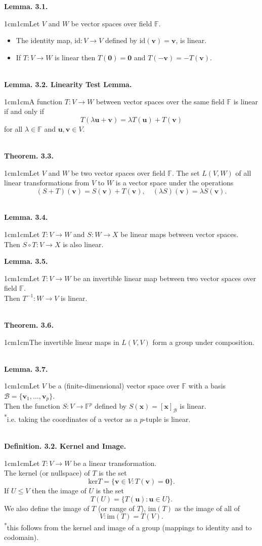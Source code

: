 \documentclass{article}
\newcommand{\vect}[1]{\mathbf{#1}}
\newcommand{\definition}[2]{\textbf{Definition. #1.}\begin{adjustwidth}{1cm}{1cm}#2\end{adjustwidth}}
\newcommand{\theorem}[2]{\textbf{Theorem. #1.}\begin{adjustwidth}{1cm}{1cm}#2\end{adjustwidth}}
\newcommand{\lemma}[2]{\textbf{Lemma. #1.}\begin{adjustwidth}{1cm}{1cm}#2\end{adjustwidth}}
\begin{document}
\lemma{3.1}{Let $V$ and $W$ be vector spaces over field $\mathbb{F}$.\begin{itemize}\item The identity map, $\text{id} : V \rightarrow V$ defined by $\text{id}(\vect{v}) = \vect{v}$, is linear. \item If $T:V \rightarrow W$ is linear then $T(\vect{0}) = \vect{0}$ and $T(-\vect{v}) = -T(\vect{v})$.\end{itemize}}~\\
\lemma{3.2. Linearity Test Lemma}{A function $T: V \rightarrow W$ between vector spaces over the same field $\mathbb{F}$ is linear if and only if \[T(\lambda \vect{u} + \vect{v}) = \lambda T(\vect{u}) + T (\vect{v})\] for all $\lambda \in \mathbb{F}$ and $\vect{u}, \vect{v} \in V$.}~\\
\theorem{3.3}{Let $V$ and $W$ be two vector spaces over field $\mathbb{F}$. The set $L(V,W)$ of all linear transformations from $V$ to $W$ is a vector space under the operations \[(S+T)(\vect{v}) = S(\vect{v}) + T(\vect{v}), \quad (\lambda S)(\vect{v}) = \lambda S(\vect{v}).\]}~\\
\lemma{3.4}{Let $T : V \rightarrow W$ and $S : W \rightarrow X$ be linear maps between vector spaces.\\Then $S \circ T: V \rightarrow X$ is also linear.}\newpage
\lemma{3.5}{Let $T : V \rightarrow W$ be an invertible linear map between two vector spaces over field $\mathbb{F}$.\\Then $T^{-1} : W \rightarrow V$ is linear.}~\\
\theorem{3.6}{The invertible linear maps in $L(V,V)$ form a group under composition.}~\\
\lemma{3.7}{Let $V$ be a (finite-dimensional) vector space over $\mathbb{F}$ with a basis $\mathcal{B} = \{ \vect{v}_1 , \ldots , \vect{v}_p \}$.\\Then the function $S : V \rightarrow \mathbb{F}^p$ defined by $S(\vect{x}) = [\vect{x}]_\mathcal{B}$ is linear.\\[1\baselineskip]\textsuperscript{*}i.e. taking the coordinates of a vector as a $p$-tuple is linear.}~\\
\definition{3.2. Kernel and Image}{Let $T : V \rightarrow W$ be a linear transformation.\\The kernel (or nullspace) of $T$ is the set \[\text{ker}T = \{ \vect{v} \in V: T(\vect{v}) = \vect{0} \}. \]If $U \leq V$ then the image of $U$ is the set \[T(U) = \{ T(\vect{u}) : \vect{u} \in U \}. \]We also define the image of $T$ (or range of $T$), $\text{im}(T)$ as the image of all of \[V: \text{im}(T) = T(V).\]\textsuperscript{*}this follows from the kernel and image of a group (mappings to identity and to codomain).}~\\
\end{document}
